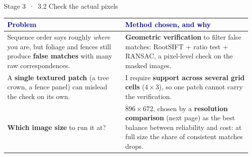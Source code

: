 \documentclass[10pt,aspectratio=169]{beamer}
\begin{document}
\begin{frame}{Stage 3 \,·\, 3.2 Check the actual pixels}
\footnotesize\setlength{\tabcolsep}{5pt}\renewcommand{\arraystretch}{1.05}
\begin{tabularx}{\textwidth}{@{}>{\raggedright\arraybackslash}p{}>{\raggedright\arraybackslash}X@{}}
\toprule \textcolor{navy}{\textbf{Problem}} & \textcolor{navy}{\textbf{Method chosen, and why}} \\ \midrule
Sequence order says roughly \emph{where} you are, but foliage and fences still produce \textbf{false matches} with many raw correspondences. & \textbf{Geometric verification} to filter false matches: RootSIFT + ratio test + RANSAC, a pixel-level check on the masked images. \\
\addlinespace[3pt]
A \textbf{single textured patch} (a tree crown, a fence panel) can mislead the check on its own. & I require \textbf{support across several grid cells} ($4\times3$), so one patch cannot carry the verification. \\
\addlinespace[3pt]
\textbf{Which image size} to run it at? & $896\times672$, chosen by a \textbf{resolution comparison} (next page) as the best balance between reliability and cost: at full size the share of consistent matches drops. \\
\bottomrule\end{tabularx}
\end{frame}
\end{document}
